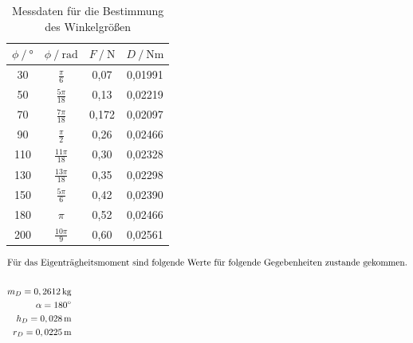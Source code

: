 \begin{table}
    \centering
    \caption{Messdaten für die Bestimmung des Winkelgrößen}
    \label{Tabelle1}
    \begin{tabular} {c  c  c  c}
        \toprule
        {$\phi  \mathbin{/}  \unit{\degree} $} &
        {$\phi  \mathbin{/}  \unit{\radian}$} &
        {$F  \mathbin{/}  \unit{\newton}$} &
        {$D \mathbin{/}  \unit{\newton\meter}$} \\
        \midrule
        \vspace{0.2cm}
        30  & $ \frac{\pi}{6} $  & 0,07  & 0,01991 \\
        \vspace{0.2cm}
        50  & $\frac{5\pi}{18}$  & 0,13  & 0,02219 \\
        \vspace{0.2cm}
        70  & $\frac{7\pi}{18}$  & 0,172 & 0,02097 \\
        \vspace{0.2cm}
        90  & $\frac{\pi}{2}$    & 0,26  & 0,02466 \\
        \vspace{0.2cm}
        110 & $\frac{11\pi}{18}$ & 0,30  & 0,02328 \\
        \vspace{0.2cm}
        130 & $\frac{13\pi}{18}$ & 0,35  & 0,02298 \\
        \vspace{0.2cm}
        150 & $\frac{5\pi}{6}$   & 0,42  & 0,02390 \\
        \vspace{0.2cm}
        180 & $\pi$              & 0,52  & 0,02466 \\
        \vspace{0.2cm}
        200 & $\frac{10\pi}{9}$  & 0,60  & 0,02561 \\
        \bottomrule
    \end{tabular} 
\end{table}

\newpage

\begin{align*}
    \intertext{Für das Eigenträgheitsmoment sind folgende Werte für folgende Gegebenheiten zustande gekommen.}  \\
    m_{D} = 0,2612\,\unit{\kilo\gram}  \\
    \alpha = 180\unit{\degree}  \\ 
    h_{D} = 0,028\,\unit{\meter} \\
    r_{D}=0,0225\,\unit{\meter} 
\end{align*}

